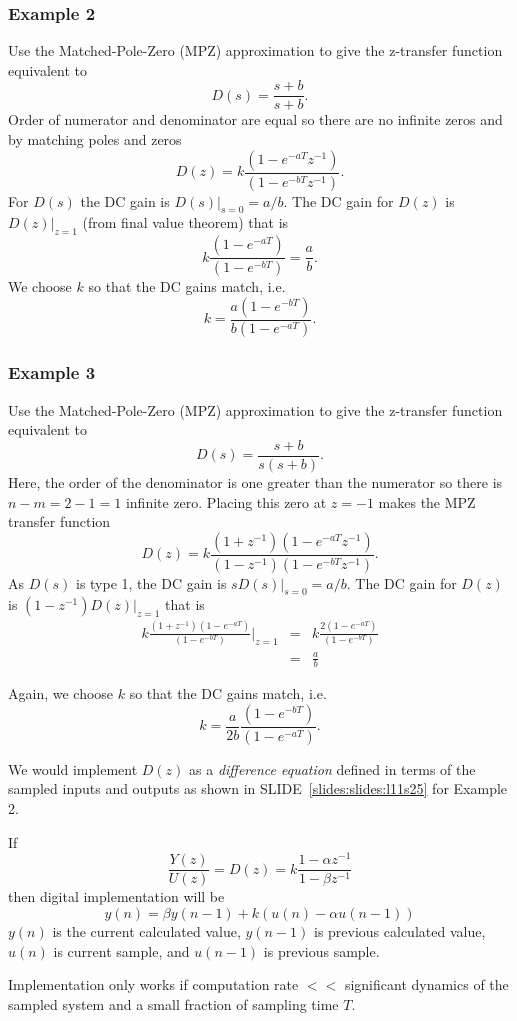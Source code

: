 \subsubsection*{Example 2}

Use the Matched-Pole-Zero (MPZ) approximation to give the z-transfer function equivalent to
$$D(s)=\frac{s+b}{s+b}.$$ Order of numerator and denominator are equal so there are no infinite zeros and by matching poles and zeros  $$D(z)=k\frac{(1-e^{-aT}z^{-1})}{(1 - e^{-bT}z^{-1})}.$$ For $D(s)$ the DC gain is $D(s)|_{s=0} = a/b$. The DC gain for $D(z)$ is $D(z)|_{z=1}$ (from final value theorem) that is $$k\frac{(1-e^{-aT})}{(1-e^{-bT})} = \frac{a}{b}.$$ We choose $k$ so that the DC gains match, i.e. $$k=\frac{a(1-e^{-bT})}{b(1-e^{-aT})}.$$

\subsubsection*{Example 3}

Use the Matched-Pole-Zero (MPZ) approximation to give the z-transfer function equivalent to
$$D(s)=\frac{s+b}{s(s+b)}.$$ Here, the order of the denominator is one greater than the numerator so there is $n-m = 2 - 1 = 1$ infinite zero. Placing this zero at $z = -1$ makes the MPZ transfer function $$D(z)=k\frac{(1+z^{-1})(1-e^{-aT}z^{-1})}{(1-z^{-1})(1 - e^{-bT}z^{-1})}.$$ As $D(s)$ is type 1, the DC gain is $sD(s)|_{s=0} = a/b$. The DC gain for $D(z)$ is $(1-z^{-1})D(z)|_{z=1}$ that is 
\begin{eqnarray*}
k\frac{(1+z^{-1})(1-e^{-aT})}{(1-e^{-bT})}|_{z=1} & = & k\frac{2(1-e^{-aT})}{(1-e^{-bT})} \\
        & = & \frac{a}{b} 
\end{eqnarray*}

Again, we choose $k$ so that the DC gains match, i.e. $$k = \frac{a}{2b}\frac{(1-e^{-bT})}{(1-e^{-aT})}.$$

We would implement $D(z)$ as a \emph{difference equation} defined in terms of the sampled inputs and outputs as shown in SLIDE~\ref{slides:slides:l11s25} for Example 2.
\begin{slide}\label{slides:l11s25}
	If $$\frac{Y(z)}{U(z)}=D(z)=k\frac{1-\alpha z^{-1}}{1-\beta z^{-1}}$$ then digital implementation will be
	$$y(n)=\beta y(n-1)+k(u(n)-\alpha u(n-1))$$
	$y(n)$ is the current calculated value, $y(n-1)$ is previous calculated value, $u(n)$ is current sample, and $u(n-1)$ is previous sample.
	
	Implementation only works if computation rate $<<$ significant dynamics of the sampled system and a small fraction of sampling time $T$.
\end{slide}

